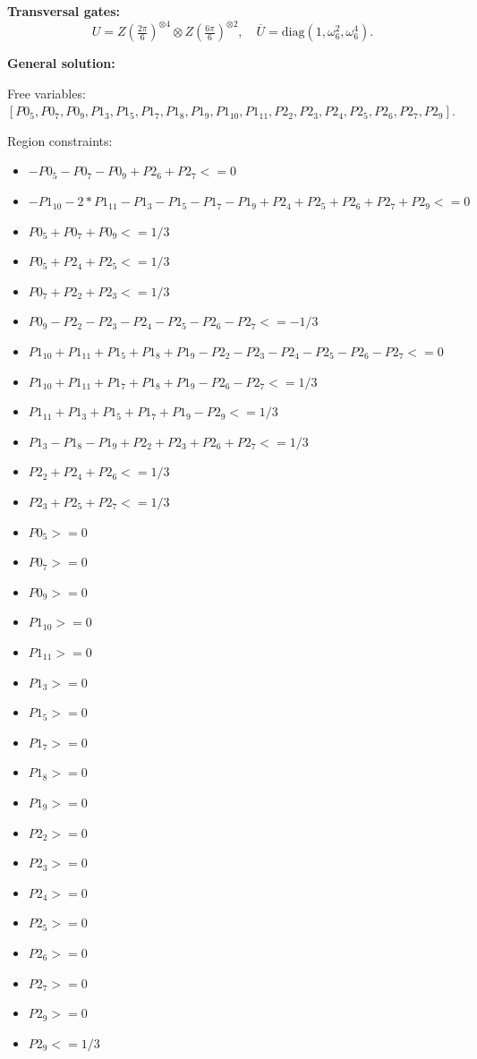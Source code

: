 \documentclass[11pt]{article}
\begin{document}
\noindent\textbf{Transversal gates:}
\[
    U=Z \left(\tfrac{2\pi}{6}\right)^{\otimes4} \otimes Z \left(\tfrac{6\pi}{6}\right)^{\otimes2},\quad
    \overline U=\mathrm{diag}(1,\omega_6^{2},\omega_6^{4}).
\]

\noindent\textbf{General solution:}

Free variables: $[P0_5, P0_7, P0_9, P1_3, P1_5, P1_7, P1_8, P1_9, P1_{10}, P1_{11}, P2_2, P2_3, P2_4, P2_5, P2_6, P2_7, P2_9]$.

Region constraints:
\begin{itemize}
    \item $-P0_5 - P0_7 - P0_9 + P2_6 + P2_7 <= 0$
    \item $-P1_{10} - 2*P1_{11} - P1_3 - P1_5 - P1_7 - P1_9 + P2_4 + P2_5 + P2_6 + P2_7 + P2_9 <= 0$
    \item $P0_5 + P0_7 + P0_9 <= 1/3$
    \item $P0_5 + P2_4 + P2_5 <= 1/3$
    \item $P0_7 + P2_2 + P2_3 <= 1/3$
    \item $P0_9 - P2_2 - P2_3 - P2_4 - P2_5 - P2_6 - P2_7 <= -1/3$
    \item $P1_{10} + P1_{11} + P1_5 + P1_8 + P1_9 - P2_2 - P2_3 - P2_4 - P2_5 - P2_6 - P2_7 <= 0$
    \item $P1_{10} + P1_{11} + P1_7 + P1_8 + P1_9 - P2_6 - P2_7 <= 1/3$
    \item $P1_{11} + P1_3 + P1_5 + P1_7 + P1_9 - P2_9 <= 1/3$
    \item $P1_3 - P1_8 - P1_9 + P2_2 + P2_3 + P2_6 + P2_7 <= 1/3$
    \item $P2_2 + P2_4 + P2_6 <= 1/3$
    \item $P2_3 + P2_5 + P2_7 <= 1/3$
    \item $P0_5 >= 0$
    \item $P0_7 >= 0$
    \item $P0_9 >= 0$
    \item $P1_{10} >= 0$
    \item $P1_{11} >= 0$
    \item $P1_3 >= 0$
    \item $P1_5 >= 0$
    \item $P1_7 >= 0$
    \item $P1_8 >= 0$
    \item $P1_9 >= 0$
    \item $P2_2 >= 0$
    \item $P2_3 >= 0$
    \item $P2_4 >= 0$
    \item $P2_5 >= 0$
    \item $P2_6 >= 0$
    \item $P2_7 >= 0$
    \item $P2_9 >= 0$
    \item $P2_9 <= 1/3$
\end{itemize}
\end{document}
